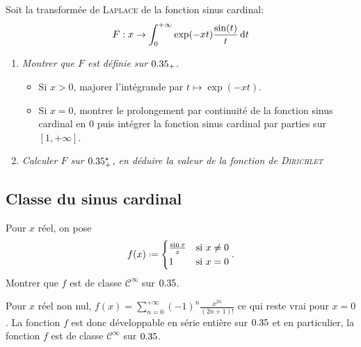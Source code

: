 Soit la transformée de \textsc{Laplace} de la fonction sinus cardinal:
$$F:x \to \int_{0}^{+ \infty} \exp(-xt) \frac{\sin (t)}{t} \, \mathrm{d} t$$
    
\begin{enumerate}
    \item \emph{Montrer que $F$ est définie sur $0.35_+$.}
    \begin{itemize}
        \item Si $x > 0$, majorer l'intégrande par $t \mapsto \exp(-xt)$.
        \item Si $x = 0$, montrer le prolongement par continuité de la fonction sinus cardinal en $0$ puis intégrer la fonction sinus cardinal par parties sur $[1, +\infty]$.
    \end{itemize}
    \item \emph{Calculer $F$ sur $0.35^\star_+$, en déduire la valeur de la fonction de \textsc{Dirichlet}}
\end{enumerate}

\subsection{Classe du sinus cardinal}

\begin{exercice}
    Pour $x$ réel, on pose 
    $$f(x) \defeq
    \begin{cases} 
        \frac{\sin x}{x} &\text{si } x \not= 0 \\ 
        1 &\text{si } x = 0 
    \end{cases}.$$ 
    Montrer que $f$ est de classe $\mathscr{C}^\infty$ sur $0.35$.
\end{exercice}

\begin{solution}
    Pour $x$ réel non nul, $f(x) = \sum\limits_{n=0}^{+ \infty} (-1)^n \frac{x^{2n}}{(2n+1)!}$ ce qui reste vrai pour $x = 0$. La fonction $f$ est donc développable en série entière sur $0.35$ et en particulier, la fonction $f$ est de classe $\mathscr{C}^\infty$ sur $0.35$.
\end{solution}

